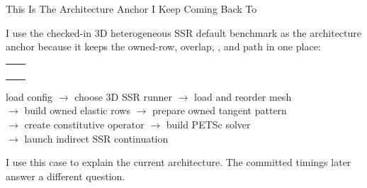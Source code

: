 \documentclass[aspectratio=169,10pt]{beamer}
\begin{document}
\begin{frame}{This Is The Architecture Anchor I Keep Coming Back To}
\small
\begin{softbox}
I use the checked-in 3D heterogeneous SSR default benchmark as the architecture anchor because it keeps the owned-row, overlap, , and  path in one place:
\begin{tabularx}{\linewidth}{@{}Y Y@{}}
 &  \\
 &  \\
 &  \\
 & \\
\end{tabularx}
\end{softbox}
\vspace{0.16cm}
\begin{pseudobox}
load config $\rightarrow$ choose 3D SSR runner $\rightarrow$ load and reorder mesh\\
$\rightarrow$ build owned elastic rows $\rightarrow$ prepare owned tangent pattern\\
$\rightarrow$ create constitutive operator $\rightarrow$ build PETSc solver\\
$\rightarrow$ launch indirect SSR continuation
\end{pseudobox}
\vspace{0.10cm}
\begin{callout}
I use this case to explain the current architecture. The committed  timings later answer a different question.
\end{callout}
\end{frame}
\end{document}

